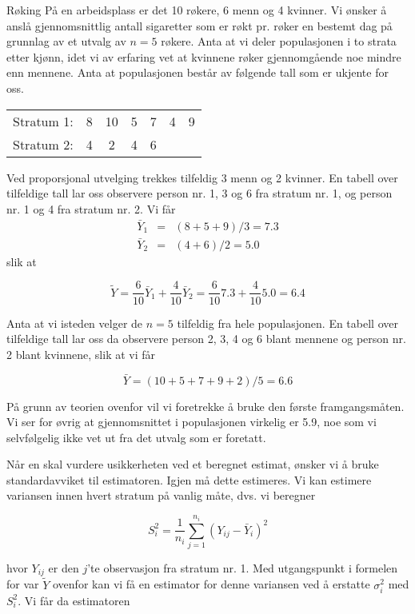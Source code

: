 \begin{eksempel}{Røking}
På en arbeidsplass er det 10 røkere, 6 menn og 4 kvinner.  Vi ønsker
å anslå gjennomsnittlig antall sigaretter som er røkt pr. røker
en bestemt dag på grunnlag av et utvalg av $n = 5$ røkere.  Anta at vi
deler populasjonen i to strata etter kjønn, idet vi av erfaring vet at
kvinnene røker gjennomgående noe mindre enn mennene.  Anta at 
populasjonen består av følgende tall som er ukjente for oss.
\begin{center}
\begin{tabular}{lcccccc}
Stratum 1: &   8   &   10   &   5   &   7   &   4   &   9 \\
Stratum 2: &   4   &    2   &   4   &   6   &       &
\end{tabular}
\end{center}
\noindent Ved proporsjonal utvelging trekkes tilfeldig 3 menn og 2 kvinner.
En tabell over tilfeldige tall lar oss observere person nr. 1, 3 og 6 fra
stratum nr. 1, og person nr. 1 og 4 fra stratum nr. 2.  Vi får 
\begin{eqnarray*}
 \bar{Y}_1&=&(8+5+9)/3=7.3 \\
 \bar{Y}_2&=&(4+6)/2=5.0
\end{eqnarray*}
\noindent slik at

\[ \tilde{Y}=\frac{6}{10}\bar{Y}_1+\frac{4}{10}\bar{Y}_2=
             \frac{6}{10}7.3+\frac{4}{10}5.0=6.4 \]
 
\noindent Anta at vi isteden velger de $n = 5$ tilfeldig fra hele populasjonen.
En tabell over tilfeldige tall lar oss da observere person 2, 3, 4 og 6 blant
mennene og person nr. 2 blant kvinnene, slik at vi får

\[ \bar{Y}=(10+5+7+9+2)/5=6.6            \]

\noindent På grunn av teorien ovenfor vil vi foretrekke å bruke den
første framgangsmåten.  Vi ser for øvrig at gjennomsnittet i
populasjonen virkelig er 5.9, noe som vi selvfølgelig ikke vet ut fra det
utvalg som er foretatt.\\
\end{eksempel}

Når en skal vurdere usikkerheten ved et beregnet estimat, ønsker vi
å bruke standardavviket til estimatoren.  Igjen må dette estimeres.
Vi kan estimere variansen innen hvert stratum på vanlig måte, dvs.
vi beregner

\[  S_i^2=\frac{1}{n_i}\sum_{j=1}^{n_i}{(Y_{ij}-\bar{Y}_i)}^2      \]

\noindent hvor $Y_{ij}$ er den $j$'te observasjon fra stratum nr. 1.  Med utgangspunkt
i formelen for var $\tilde{Y}$ ovenfor kan vi få en estimator for denne
variansen ved å erstatte ${\sigma}_i^2$  med $S_i^2$.  Vi får da
estimatoren

